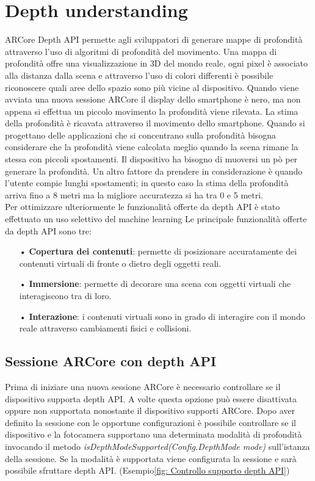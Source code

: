 \documentclass[crop=false, class=book]{standalone}
\begin{document}
		
	\chapter{Depth understanding}
	
		ARCore Depth API  permette agli sviluppatori di generare mappe di profondità attraverso l'uso di algoritmi di 					profondità del movimento. Una mappa di profondità offre una visualizzazione in 3D del mondo reale, ogni pixel è 				associato alla distanza dalla scena e attraverso l'uso di colori differenti è possibile riconoscere quali aree dello 			spazio sono più vicine al dispositivo. Quando viene avviata una nuova sessione ARCore il display dello smartphone è 			nero, ma non appena si effettua un piccolo movimento la profondità viene rilevata. La stima della profondità è ricavata 		attraverso il movimento dello smartphone. Quando si progettano delle applicazioni che si concentrano sulla profondità 			bisogna considerare che la profondità viene calcolata meglio quando la scena rimane la stessa con piccoli spostamenti. 			Il dispositivo ha bisogno di muoversi un pò per generare la profondità. Un altro fattore da prendere in considerazione 			è quando l'utente compie lunghi spostamenti; in questo caso la stima della profondità arriva fino a 8 metri ma la 				migliore accuratezza si ha tra 0 e 5 metri.\\
		Per ottimizzare ulteriormente le funzionalità offerte da depth API è stato effettuato un uso selettivo del machine 				learning
		 Le principale funzionalità offerte da depth API sono tre:
		\begin{itemize}
			\item[•] \textbf{Copertura dei contenuti}: permette di posizionare accuratamente dei contenuti virtuali di fronte o dietro degli oggetti reali.
			\item[•] \textbf{Immersione}: permette di decorare una scena con oggetti virtuali che interagiscono tra di loro.
			\item[•] \textbf{Interazione}: i contenuti virtuali sono in grado di interagire con il mondo reale attraverso cambiamenti fisici e collisioni.
		\end{itemize}
		
		
		\section{Sessione ARCore con depth API}
		
		Prima di iniziare una nuova sessione ARCore è necessario controllare se il dispositivo supporta depth API. A volte 				questa opzione può essere disattivata oppure non supportata nonostante il dispositivo supporti ARCore. Dopo aver 				definito la sessione con le opportune configurazioni è possibile controllare se il dispositivo e la fotocamera 					supportano una determinata modalità di profondità invocando il metodo \textit{isDepthModeSupported(Config.DepthMode 			mode)} sull'istanza della sessione. Se la modalità è supportata viene configurata la sessione e sarà possibile 					sfruttare depth API. (Esempio\vref{fig: Controllo supporto depth API})\\
		
\end{document}
